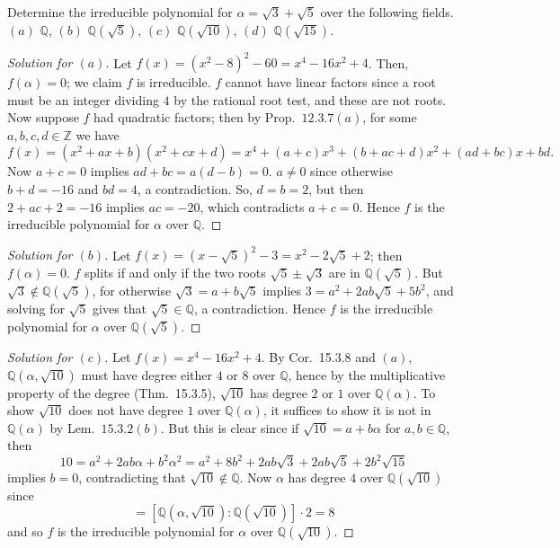 \documentclass[12pt]{article}
\theoremstyle{remark}
\begin{document}
\begin{problem}
  Determine the irreducible polynomial for $\alpha = \sqrt{3} + \sqrt{5}$ over the following fields. $(a)$ $\mathbb{Q}$, $(b)$ $\mathbb{Q}(\sqrt{5})$, $(c)$ $\mathbb{Q}(\sqrt{10})$, $(d)$ $\mathbb{Q}(\sqrt{15})$.
\end{problem}
\begin{proof}[Solution for $(a)$]
  Let $f(x) = (x^2 - 8)^2 - 60 = x^4 - 16x^2 + 4$. Then, $f(\alpha) = 0$; we claim $f$ is irreducible. $f$ cannot have linear factors since a root must be an integer dividing $4$ by the rational root test, and these are not roots. Now suppose $f$ had quadratic factors; then by Prop.~$12.3.7(a)$, for some $a,b,c,d \in \mathbb{Z}$ we have
  \begin{equation*}
    f(x) = (x^2 + ax + b)(x^2 + cx + d) = x^4 + (a+c)x^3 + (b + ac + d)x^2 + (ad + bc)x + bd.
  \end{equation*}
  Now $a+c = 0$ implies $ad + bc = a(d-b) = 0$. $a\ne0$ since otherwise $b + d = -16$ and $bd = 4$, a contradiction. So, $d=b = 2$, but then $2 + ac + 2 = -16$ implies $ac = -20$, which contradicts $a+c=0$. Hence $f$ is the irreducible polynomial for $\alpha$ over $\mathbb{Q}$.
\end{proof}
\begin{proof}[Solution for $(b)$]
  Let $f(x) = (x - \sqrt{5})^2-3 = x^2 - 2\sqrt{5} + 2$; then $f(\alpha) = 0$. $f$ splits if and only if the two roots $\sqrt{5}\pm\sqrt{3}$ are in $\mathbb{Q}(\sqrt{5})$. But $\sqrt{3} \notin \mathbb{Q}(\sqrt{5})$, for otherwise $\sqrt{3} = a + b\sqrt{5}$ implies $3 = a^2 + 2ab\sqrt{5} + 5b^2$, and solving for $\sqrt{5}$ gives that $\sqrt{5} \in \mathbb{Q}$, a contradiction. Hence $f$ is the irreducible polynomial for $\alpha$ over $\mathbb{Q}(\sqrt{5})$.
\end{proof}
\begin{proof}[Solution for $(c)$]
  Let $f(x) = x^4 - 16x^2 + 4$. By Cor.~15.3.8 and $(a)$, $\mathbb{Q}(\alpha,\sqrt{10})$ must have degree either $4$ or $8$ over $\mathbb{Q}$, hence by the multiplicative property of the degree (Thm.~15.3.5), $\sqrt{10}$ has degree $2$ or $1$ over $\mathbb{Q}(\alpha)$. To show $\sqrt{10}$ does not have degree $1$ over $\mathbb{Q}(\alpha)$, it suffices to show it is not in $\mathbb{Q}(\alpha)$ by Lem.~$15.3.2(b)$. But this is clear since if $\sqrt{10} = a + b\alpha$ for $a,b\in\mathbb{Q}$, then
  \begin{equation*}
    10 = a^2 + 2ab\alpha + b^2\alpha^2 = a^2 + 8b^2 + 2ab\sqrt{3} + 2ab\sqrt{5} + 2b^2\sqrt{15}
  \end{equation*}
  implies $b=0$, contradicting that $\sqrt{10} \notin \mathbb{Q}$. Now $\alpha$ has degree $4$ over $\mathbb{Q}(\sqrt{10})$ since
  \begin{equation*}
    [\mathbb{Q}(\alpha,\sqrt{10}) : \mathbb{Q}(\sqrt{10})][\mathbb{Q}(\sqrt{10}) : \mathbb{Q}] = [\mathbb{Q}(\alpha,\sqrt{10}) : \mathbb{Q}(\sqrt{10})] \cdot 2 = 8
  \end{equation*}
  and so $f$ is the irreducible polynomial for $\alpha$ over $\mathbb{Q}(\sqrt{10})$.
\end{proof}
\end{document}
